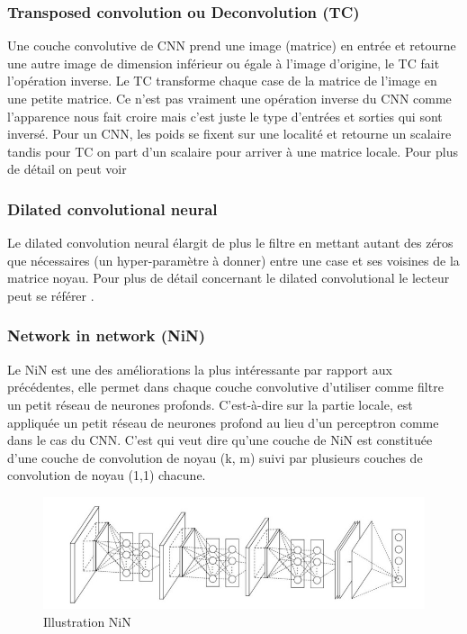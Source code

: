 \subsubsection{Transposed convolution ou Deconvolution (TC)}
Une couche convolutive de CNN prend une image (matrice) en entrée et retourne une autre image de dimension inférieur ou égale à l'image d'origine, le TC fait l'opération inverse. Le TC transforme chaque case de la matrice de l'image en une petite matrice. Ce n'est pas vraiment une opération inverse du CNN comme l'apparence nous fait croire mais c'est juste le type d'entrées et sorties qui sont inversé. Pour un CNN, les poids se fixent sur une localité et retourne un scalaire tandis pour TC on part d'un scalaire pour arriver à une matrice locale. Pour plus de détail on peut voir \cite{transcd1, transcd2, transcd3,transcd4, transcd5}  
\subsubsection{Dilated convolutional neural}
Le dilated convolution neural élargit de plus le filtre en mettant autant des zéros que nécessaires (un hyper-paramètre à donner) entre une case et ses voisines de la matrice noyau. Pour plus de détail concernant le dilated convolutional le lecteur peut se référer \cite{dilate1, dilate2, dilate3, dilate4}.
\subsubsection{Network in network (NiN)}
Le NiN\cite{nin1} est une des améliorations la plus intéressante par rapport aux précédentes, elle permet dans chaque couche convolutive d'utiliser comme filtre un petit réseau de neurones profonds. C'est-à-dire sur la partie locale, est appliquée un petit réseau de neurones profond au lieu d'un perceptron comme dans le cas du CNN. C'est qui veut dire qu'une couche de NiN est constituée d'une couche de convolution de noyau (k, m) suivi par plusieurs couches de convolution de noyau (1,1) chacune.

\begin{figure}[H]
    \centering
    \includegraphics[scale = 0.5]{images/nin.jpg}
    \caption{Illustration NiN}
\end{figure}
